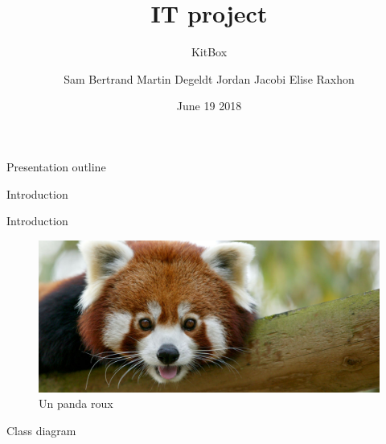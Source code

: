 \documentclass[14pt,english]{beamer}
\title{IT project}
\subtitle{KitBox}
\author{Sam Bertrand\newline
Martin Degeldt\newline
Jordan Jacobi\newline
Elise Raxhon\newline}
\institute{ECAM 3BE}
\date{June 19 2018}
\begin{document}
\begin{frame}[plain]
\maketitle
\end{frame}

\begin{frame}{Presentation outline}
\begin{fullpageitemize}
  \end{fullpageitemize}
\end{frame}


\begin{frame}{Introduction}
\begin{fullpageitemize}
\itemD {}
 \end{fullpageitemize}
\end{frame}

\begin{frame}{Introduction}
    \begin{figure}
    \centering
    \includegraphics[width=\textwidth]{images/panda-roux-2.jpg}
    \caption{Un panda roux}
    \label{fig:panda_label}
\end{figure}

\end{frame}{}


\begin{frame}{Class diagram}
\begin{fullpageitemize}
\itemD {}
 \end{fullpageitemize}
\end{frame}
\end{document}

